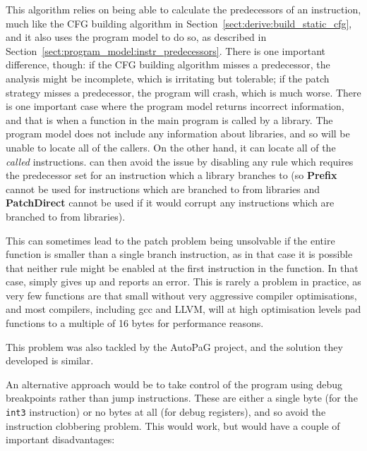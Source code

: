 This algorithm relies on being able to calculate the predecessors of
an instruction, much like the CFG building algorithm in
Section~\ref{sect:derive:build_static_cfg}, and it also uses the
program model to do so, as described in
Section~\ref{sect:program_model:instr_predecessors}.   There is one important difference, though: if
the CFG building algorithm misses a predecessor, the analysis might be
incomplete, which is irritating but tolerable; if the patch strategy
misses a predecessor, the program will crash, which is much worse.
There is one important case where the program model returns incorrect
information, and that is when a function in the main program is called
by a library.  The program model does not include any information
about libraries, and so will be unable to locate all of the callers.
On the other hand, it can locate all of the \emph{called}
instructions.  {\Technique} can then avoid the issue by disabling any
rule which requires the predecessor set for an instruction which a
library branches to (so \textbf{Prefix} cannot be used for
instructions which are branched to from libraries and
\textbf{PatchDirect} cannot be used if it would corrupt any
instructions which are branched to from libraries).

This can sometimes lead to the patch problem being unsolvable if the
entire function is smaller than a single branch instruction, as in
that case it is possible that neither rule might be enabled at the
first instruction in the function.  In that case, {\implementation}
simply gives up and reports an error.  This is rarely a problem in
practice, as very few functions are that small without very aggressive
compiler optimisations, and most compilers, including gcc and
LLVM\needCite{}, will at high optimisation levels pad functions to a
multiple of 16 bytes for performance reasons.

This problem was also tackled by the AutoPaG project, and the solution
they developed is similar. 

An alternative approach would be to take control of the program using
debug breakpoints rather than jump instructions.  These are either a
single byte (for the \verb|int3| instruction) or no bytes at all (for
debug registers), and so avoid the instruction clobbering problem.
This would work, but would have a couple of important disadvantages:


